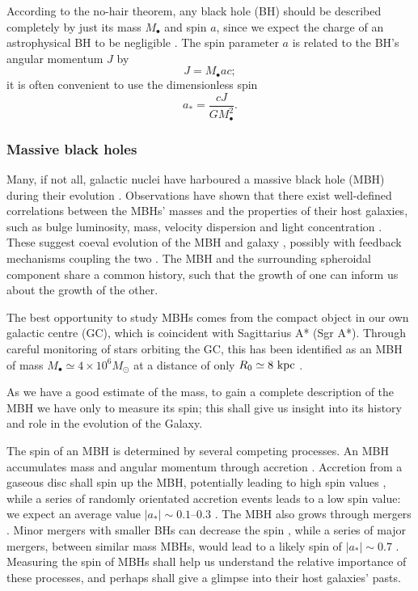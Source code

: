 {According to the no-hair theorem, any black hole (BH) should be described completely by just its mass $M_\bullet$ and spin $a$, since we expect the charge of an astrophysical BH to be negligible \citep{Israel1967, Israel1968, Carter1971, Hawking1972, Robinson1975, Chandrasekhar1998}. The spin parameter $a$ is related to the BH's angular momentum $J$ by
\begin{equation}
J = M_\bullet ac;
\end{equation}
it is often convenient to use the dimensionless spin
\begin{equation}
a_\ast = \frac{cJ}{GM_\bullet^2}.
\end{equation}
\subsubsection{Massive black holes}

Many, if not all, galactic nuclei have harboured a massive black hole (MBH) during their evolution \citep{Lynden-Bell1971, Soltan1982, Rees1984}. Observations have shown that there exist well-defined correlations between the MBHs' masses and the properties of their host galaxies, such as bulge luminosity, mass, velocity dispersion and light concentration \citep{Kormendy1995, Magorrian1998, Ferrarese2000, Gebhardt2000, Graham2001, Tremaine2002, Marconi2003, Haring2004, Graham2007, Graham2011}. These suggest coeval evolution of the MBH and galaxy \citep{Peng2007, Jahnke2011}, possibly with feedback mechanisms coupling the two \citep{Haiman2004, Volonteri2009}. The MBH and the surrounding spheroidal component share a common history, such that the growth of one can inform us about the growth of the other.

The best opportunity to study MBHs comes from the compact object in our own galactic centre (GC), which is coincident with Sagittarius A* (Sgr A*). Through careful monitoring of stars orbiting the GC, this has been identified as an MBH of mass $M_\bullet \simeq 4 \times 10^6 M_\odot$ at a distance of only $R_0 \simeq 8~\mathrm{kpc}$ \citep{Gillessen2009, Meyer2012}.

As we have a good estimate of the mass, to gain a complete description of the MBH we have only to measure its spin; this shall give us insight into its history and role in the evolution of the Galaxy.

The spin of an MBH is determined by several competing processes. An MBH accumulates mass and angular momentum through accretion \citep{Volonteri2010}. Accretion from a gaseous disc shall spin up the MBH, potentially leading to high spin values \citep{Volonteri2005}, while a series of randomly orientated accretion events leads to a low spin value: we expect an average value $|a_\ast| \sim 0.1$--$0.3$ \citep{King2006, King2008}. The MBH also grows through mergers \citep{Yu2002, Malbon2007}. Minor mergers with smaller BHs can decrease the spin \citep{Hughes2003, Gammie2004}, while a series of major mergers, between similar mass MBHs, would lead to a likely spin of $|a_\ast| \sim 0.7$ \citep{Berti2008, Berti2007, Gonzalez2007}. Measuring the spin of MBHs shall help us understand the relative importance of these processes, and perhaps shall give a glimpse into their host galaxies' pasts.

}

